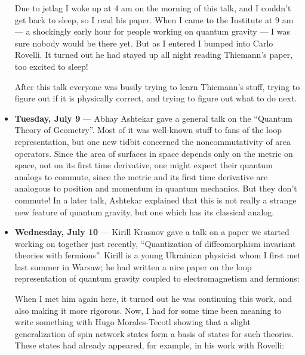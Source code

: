 \documentclass{article}
\def\tightlist{}
\renewcommand{\texttt}[1]{%
  \begingroup
  \ttfamily
  \begingroup\lccode`~=`/\lowercase{\endgroup\def~}{/\discretionary{}{}{}}%
  \begingroup\lccode`~=`[\lowercase{\endgroup\def~}{[\discretionary{}{}{}}%
  \begingroup\lccode`~=`.\lowercase{\endgroup\def~}{.\discretionary{}{}{}}%
  \catcode`/=\active\catcode`[=\active\catcode`.=\active
  \scantokens{#1\noexpand}%
  \endgroup
}
\begin{document}
\begin{itemize}
  Due to jetlag I woke up at 4 am on the morning of this talk, and I
  couldn't get back to sleep, so I read his paper. When I came to the
  Institute at 9 am --- a shockingly early hour for people working on
  quantum gravity --- I was sure nobody would be there yet. But as I
  entered I bumped into Carlo Rovelli. It turned out he had stayed up
  all night reading Thiemann's paper, too excited to sleep!

  After this talk everyone was busily trying to learn Thiemann's stuff,
  trying to figure out if it is physically correct, and trying to figure
  out what to do next.
\item
  \textbf{Tuesday, July 9} --- Abhay Ashtekar gave a general talk on the
  ``Quantum Theory of Geometry''. Most of it was well-known stuff to
  fans of the loop representation, but one new tidbit concerned the
  noncommutativity of area operators. Since the area of surfaces in
  space depends only on the metric on space, not on its first time
  derivative, one might expect their quantum analogs to commute, since
  the metric and its first time derivative are analogous to position and
  momentum in quantum mechanics. But they don't commute! In a later
  talk, Ashtekar explained that this is not really a strange new feature
  of quantum gravity, but one which has its classical analog.
\item
  \textbf{Wednesday, July 10} --- Kirill Krasnov gave a talk on a paper
  we started working on together just recently, ``Quantization of
  diffeomorphism invariant theories with fermions''. Kirill is a young
  Ukrainian physicist whom I first met last summer in Warsaw; he had
  written a nice paper on the loop representation of quantum gravity
  coupled to electromagnetism and fermions:


  When I met him again here, it turned out he was continuing this work,
  and also making it more rigorous. Now, I had for some time been
  meaning to write something with Hugo Morales-Tecotl showing that a
  slight generalization of spin network states form a basis of states
  for such theories. These states had already appeared, for example, in
  his work with Rovelli:


\end{itemize}
\end{document}
